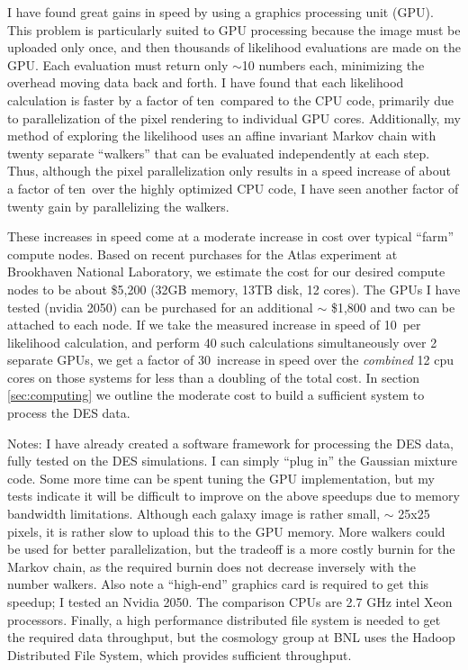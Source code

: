 \documentclass[12pt]{article}
\newcommand{\speedupnum}{10}
\newcommand{\speedup}{ten}
\newcommand{\overallspeedup}{30}
\begin{document}
I have found great gains in speed by using a graphics processing unit (GPU).
This problem is particularly suited to GPU processing because the image must be
uploaded only once, and then thousands of likelihood evaluations are made on
the GPU. Each evaluation must return only $\sim$10 numbers each, minimizing the
overhead moving data back and forth.  I have found that each likelihood
calculation is faster by a factor of \speedup\ compared to the CPU code,
primarily due to parallelization of the pixel rendering to individual GPU
cores.  Additionally, my method of exploring the likelihood uses an affine
invariant Markov chain\cite{GoodmanWeare10} with twenty separate ``walkers''
that can be evaluated independently at each step.  Thus, although the pixel
parallelization only results in a speed increase of about a factor of \speedup\
over the highly optimized CPU code, I have seen another factor of twenty gain
by parallelizing the walkers.  

These increases in speed come at a moderate increase in cost over typical
``farm'' compute nodes.  Based on recent purchases for the Atlas experiment at
Brookhaven National Laboratory, we estimate the cost for our desired compute
nodes to be about \$5,200 (32GB memory, 13TB disk, 12 cores).  The GPUs I have
tested (nvidia 2050) can be purchased for an additional $\sim$ \$1,800 and two
can be attached to each node.  If we take the measured increase in speed of
\speedupnum\ per likelihood calculation, and perform 40 such calculations
simultaneously over 2 separate GPUs, we get a factor of \overallspeedup\
increase in speed over the {\it combined} 12 cpu cores on those systems for less than
a doubling of the total cost.  In section \ref{sec:computing} we outline the
moderate cost to build a sufficient system to process the DES data.

Notes: I have already created a software framework for processing the DES data,
fully tested on the DES simulations.  I can simply ``plug in'' the Gaussian
mixture code.  Some more time can be spent tuning the GPU implementation, but
my tests indicate it will be difficult to improve on the above speedups due to
memory bandwidth limitations.  Although each galaxy image is rather small,
$\sim$ 25x25 pixels, it is rather slow to upload this to the GPU memory.  More
walkers could be used for better parallelization, but the tradeoff is a more
costly burnin for the Markov chain, as the required burnin does not decrease
inversely with the number walkers.  Also note a ``high-end'' graphics card is
required to get this speedup; I tested an Nvidia 2050. The comparison CPUs are
2.7 GHz intel Xeon processors.  Finally, a high performance distributed file
system is needed to get the required data throughput, but the cosmology group
at BNL uses the Hadoop Distributed File System, which provides sufficient
throughput.
\end{document}
